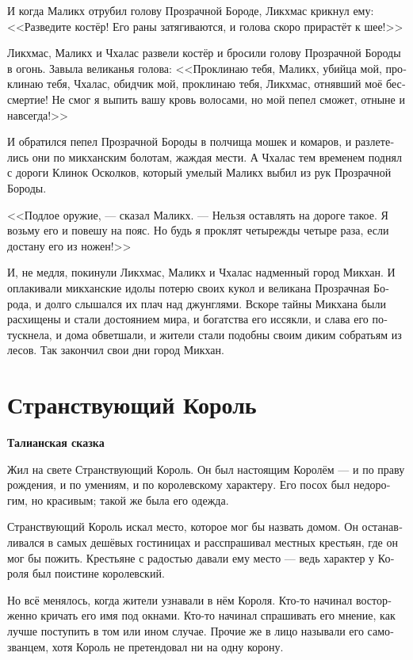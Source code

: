 \documentclass[a4paper,12pt,fleqn]{book}\usepackage{polyglossia}\setdefaultlanguage[babelshorthands=true]{russian}\setotherlanguage{english}\defaultfontfeatures{Ligatures=TeX,Mapping=tex-text}\usepackage{xcolor}\newcommand{\ml}[3]{#2}
\newcommand{\textspace}{\vspace{1em}{\centering\Large\bfseries<...>\par}\vspace{1em}}
\begin{document}
{\textspace

И когда Маликх отрубил голову Прозрачной Бороде, Ликхмас крикнул ему:
<<Разведите костёр!
Его раны затягиваются, и голова скоро прирастёт к шее!>>

Ликхмас, Маликх и Чхалас развели костёр и бросили голову Прозрачной Бороды в огонь.
Завыла великанья голова:
<<Проклинаю тебя, Маликх, убийца мой, проклинаю тебя, Чхалас, обидчик мой, проклинаю тебя, Ликхмас, отнявший моё бессмертие!
Не смог я выпить вашу кровь волосами, но мой пепел сможет, отныне и навсегда!>>

И обратился пепел Прозрачной Бороды в полчища мошек и комаров, и разлетелись они по микханским болотам, жаждая мести.
А Чхалас тем временем поднял с дороги Клинок Осколков, который умелый Маликх выбил из рук Прозрачной Бороды.

<<Подлое оружие, --- сказал Маликх.
\ml{$0$}
{--- Нельзя оставлять на дороге такое.}
{``It mustn't be left on the road.}
Я возьму его и повешу на пояс.
\ml{$0$}
{Но будь я проклят четырежды четыре раза, если достану его из ножен!>>}
{But let me be cursed twice and twice again if I unsheathe it!''}

И, не медля, покинули Ликхмас, Маликх и Чхалас надменный город Микхан.
И оплакивали микханские идолы потерю своих кукол и великана Прозрачная Борода, и долго слышался их плач над джунглями.
Вскоре тайны Микхана были расхищены и стали достоянием мира, и богатства его иссякли, и слава его потускнела, и дома обветшали, и жители стали подобны своим диким собратьям из лесов.
Так закончил свои дни город Микхан.

\section{Странствующий Король}

\textbf{Талианская сказка}

Жил на свете Странствующий Король.
Он был настоящим Королём --- и по праву рождения, и по умениям, и по королевскому характеру.
Его посох был недорогим, но красивым;
такой же была его одежда.

Странствующий Король искал место, которое мог бы назвать домом.
Он останавливался в самых дешёвых гостиницах и расспрашивал местных крестьян, где он мог бы пожить.
Крестьяне с радостью давали ему место --- ведь характер у Короля был поистине королевский.

Но всё менялось, когда жители узнавали в нём Короля.
Кто-то начинал восторженно кричать его имя под окнами.
Кто-то начинал спрашивать его мнение, как лучше поступить в том или ином случае.
Прочие же в лицо называли его самозванцем, хотя Король не претендовал ни на одну корону.

}
\end{document}
